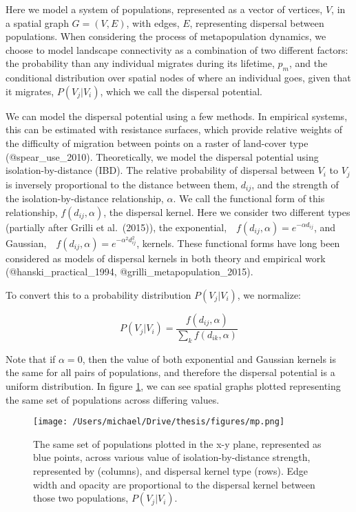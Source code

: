 Here we model a system of populations, represented as a vector of
vertices, \(V\), in a spatial graph \(G=(V,E)\), with edges, \(E\),
representing dispersal between populations. When considering the process
of metapopulation dynamics, we choose to model landscape connectivity as
a combination of two different factors: the probability than any
individual migrates during its lifetime, \(p_m\), and the conditional
distribution over spatial nodes of where an individual goes, given that
it migrates, \(P(V_j|V_i)\), which we call the dispersal potential.

We can model the dispersal potential using a few methods. In empirical
systems, this can be estimated with resistance surfaces, which provide
relative weights of the difficulty of migration between points on a
raster of land-cover type (@spear\_use\_2010). Theoretically, we model
the dispersal potential using isolation-by-distance (IBD). The relative
probability of dispersal between \(V_i\) to \(V_j\) is inversely
proportional to the distance between them, \(d_{ij}\), and the strength
of the isolation-by-distance relationship, \(\alpha\). We call the
functional form of this relationship, \(f(d_{ij}, \alpha)\), the
dispersal kernel. Here we consider two different types (partially after
Grilli et al.~(2015)), the
exponential, \(f(d_{ij}, \alpha)=e^{-\alpha d_{ij}}\), and
Gaussian, \(f(d_{ij}, \alpha)=e^{-\alpha^2 d_{ij}^2}\), kernels. These
functional forms have long been considered as models of dispersal
kernels in both theory and empirical work (@hanski\_practical\_1994,
@grilli\_metapopulation\_2015).

To convert this to a probability distribution \(P(V_j|V_i)\), we
normalize:

\[P(V_j|V_i)=\frac{f(d_{ij}, \alpha)}{\sum_k f(d_{ik},\alpha)}\]

Note that if \(\alpha=0\), then the value of both exponential and
Gaussian kernels is the same for all pairs of populations, and therefore
the dispersal potential is a uniform distribution. In figure \ref{mp},
we can see spatial graphs plotted representing the same set of
populations across differing values.

\begin{figure}[h]

\texttt{[image: /Users/michael/Drive/thesis/figures/mp.png]}

\caption{The same set of populations plotted in the x-y plane, represented as blue points, across various value of isolation-by-distance strength, represented by (columns), and dispersal kernel type (rows). Edge width and opacity are proportional to the dispersal kernel between those two populations, $P(V_j | V_i)$.}

\label{mp}

\end{figure}

